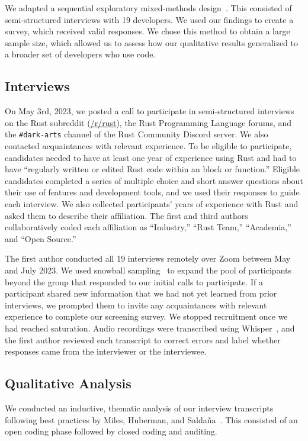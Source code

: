 We adapted a sequential exploratory mixed-methods design~\cite{mixed_methods_designs}. This consisted of semi-structured interviews with 19 developers. We used our findings to create a survey, which received  valid responses. We chose this method to obtain a large sample size, which allowed us to assess how our qualitative results generalized to a broader set of developers who use \unsafe code.

\subsection{Interviews} 
On May 3rd, 2023, we posted a call to participate in semi-structured interviews on the Rust subreddit (\href{https://www.reddit.com/r/rust/}{/r/rust}), the Rust Programming Language forums, and the \verb|#dark-arts| channel of the Rust Community Discord server. We also contacted acquaintances with relevant experience. To be eligible to participate, candidates needed to have at least one year of experience using Rust and had to have ``regularly written or edited Rust code within an \unsafe block or function.'' Eligible candidates completed a series of multiple choice and short answer questions about their use of \unsafe features and development tools, and we used their responses to guide each interview. We also collected participants' years of experience with Rust and asked them to describe their affiliation. The first and third authors collaboratively coded each affiliation as ``Industry,'' ``Rust Team,'' ``Academia,'' and ``Open Source.''

The first author conducted all 19 interviews remotely over Zoom between May and July 2023. We used snowball sampling~\cite{patton1990qualitative} to expand the pool of participants beyond the group that responded to our initial calls to participate. If a participant shared new information that we had not yet learned from prior interviews, we prompted them to invite any acquaintances with relevant experience to complete our screening survey. We stopped recruitment once we had reached saturation. Audio recordings were transcribed using Whisper~\cite{whisper}, and the first author reviewed each transcript to correct errors and label whether responses came from the interviewer or the interviewee.

\subsection{Qualitative Analysis}
We conducted an inductive, thematic analysis of our interview transcripts following best practices by Miles, Huberman, and Saldaña~\cite{miles20}. This consisted of an open coding phase followed by closed coding and auditing. 

